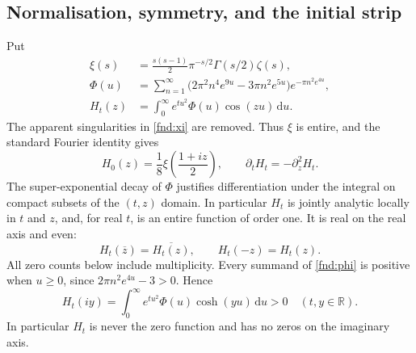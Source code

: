 \documentclass[11pt,a4paper]{article}
\theoremstyle{definition}
\theoremstyle{remark}
\newcommand{\dd}{\mathrm d}
\begin{document}
\subsection{Normalisation, symmetry, and the initial strip}
\label{fnd:normalisation}

Put
\begin{align}
 \xi(s)&=\frac{s(s-1)}2\pi^{-s/2}\Gamma(s/2)\zeta(s),\label{fnd:xi}\\
 \Phi(u)&=\sum_{n=1}^{\infty}
 \bigl(2\pi^2n^4e^{9u}-3\pi n^2e^{5u}\bigr)e^{-\pi n^2e^{4u}},\label{fnd:phi}\\
 H_t(z)&=\int_0^{\infty}e^{tu^2}\Phi(u)\cos(zu)\,\dd u.
 \label{fnd:heatdefinition}
\end{align}
The apparent singularities in \eqref{fnd:xi} are removed. Thus $\xi$ is
entire, and the standard Fourier identity gives
\begin{equation}
 H_0(z)=\frac18\xi\left(\frac{1+iz}{2}\right),
 \qquad \partial_tH_t=-\partial_z^2H_t.
 \label{fnd:heat}
\end{equation}
The super-exponential decay of $\Phi$ justifies differentiation under the
integral on compact subsets of the $(t,z)$ domain. In particular $H_t$ is
jointly analytic locally in $t$ and $z$, and, for real $t$, is an entire
function of order one. It is real on the real axis and even:
\begin{equation}
 H_t(\overline z)=\overline{H_t(z)},\qquad H_t(-z)=H_t(z).
 \label{fnd:symmetry}
\end{equation}
All zero counts below include multiplicity. Every summand of
\eqref{fnd:phi} is positive when $u\geq0$, since
$2\pi n^2e^{4u}-3>0$. Hence
\begin{equation}
 H_t(iy)=\int_0^{\infty}e^{tu^2}\Phi(u)\cosh(yu)\,\dd u>0
 \quad(t,y\in\mathbb R).
 \label{fnd:imaginarypositive}
\end{equation}
In particular $H_t$ is never the zero function and has no zeros on the
imaginary axis.
\end{document}
